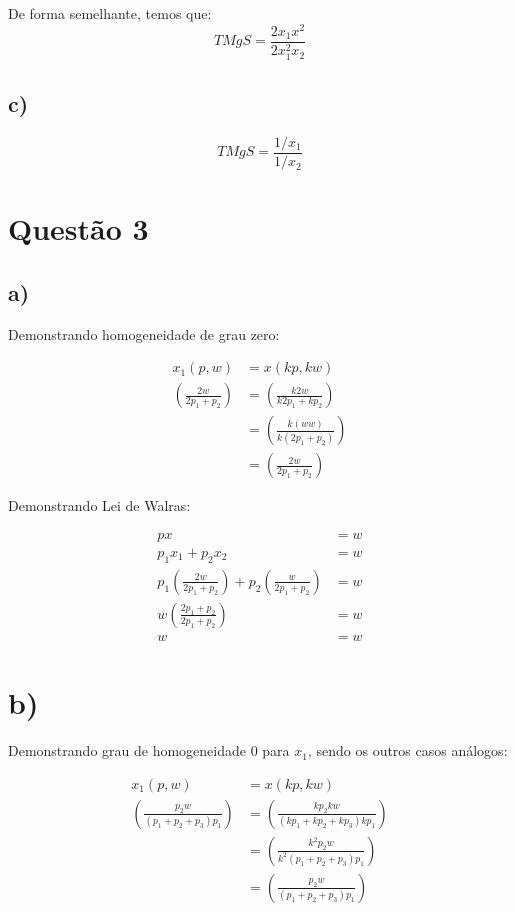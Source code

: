 \documentclass[
  letterpaper,
  DIV=11,
  numbers=noendperiod]{scrartcl}
\begin{document}
De forma semelhante, temos que: \[
TMgS = \frac{2 x_1 x^2}{2 x_1^2 x_2}
\]

\subsection{c)}\label{c}

\[
TMgS = \frac{1/x_1}{1/x_2}
\]

\section{Questão 3}\label{questuxe3o-3}

\subsection{a)}\label{a-1}

Demonstrando homogeneidade de grau zero:

\begin{align}
x_1(p,w) &= x(kp, kw) \\
\left( \frac{2w}{2p_1 + p_2} \right) &= \left( \frac{k2w}{k2p_1 + kp_2} \right) \\
&= \left( \frac{k(ww)}{k(2p_1 + p_2)} \right) \\
&= \left( \frac{2w}{2p_1 + p_2} \right)
\end{align}

Demonstrando Lei de Walras:

\begin{align}
px &= w \\
p_1x_1 + p_2x_2 &= w \\
p_1 \left(\frac{2w}{2p_1 + p_2} \right) + p_2 \left(\frac{w}{2p_1 + p_2} \right) &= w \\
w \left(\frac{2p_1 + p_2}{2p_1 + p_2}\right) &= w \\
w &= w
\end{align}

\section{b)}\label{b-1}

Demonstrando grau de homogeneidade 0 para \(x_1\), sendo os outros casos
análogos:

\begin{align}
x_1(p,w) &= x(kp, kw) \\
\left(\frac{p_2w}{(p_1+p_2+p_3)p_1}\right) &= \left(\frac{kp_2kw}{(kp_1+kp_2+kp_3)kp_1}\right) \\
&= \left(\frac{k^2p_2w}{k^2(p_1+p_2+p_3)p_1}\right) \\
&= \left(\frac{p_2w}{(p_1+p_2+p_3)p_1}\right)
\end{align}
\end{document}
